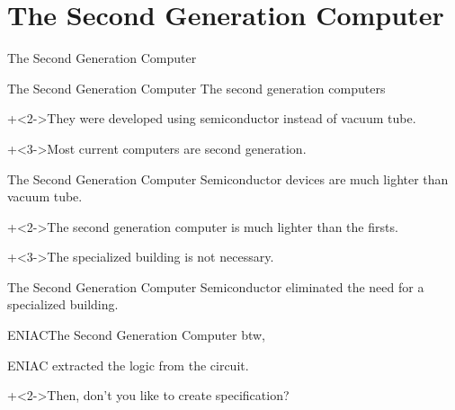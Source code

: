 %
%

\section{The Second Generation Computer}


\begin{frame}{}{}
    {\Large The Second Generation Computer}
\end{frame}


\begin{frame}{The Second Generation Computer}{}
    The second generation computers
    \vspace{2ex}

    \onslide+<2->{They were developed using semiconductor instead of vacuum tube.}
    \vspace{4ex}

    \onslide+<3->{Most current computers are second generation.}
\end{frame}


\begin{frame}{The Second Generation Computer}{}
    Semiconductor devices are much lighter than vacuum tube.
    \vspace{4ex}

    \onslide+<2->{The second generation computer is much lighter than the firsts.}
    \vspace{4ex}

    \onslide+<3->{The specialized building is not necessary.}
\end{frame}


\begin{frame}{The Second Generation Computer}{}
    Semiconductor eliminated the need for a specialized building.
\end{frame}


\begin{frame}{ENIAC}{The Second Generation Computer}
    btw,
    \vspace{2ex}

    ENIAC extracted the logic from the circuit.
    \vspace{4ex}

    \onslide+<2->{Then, don't you like to create specification?}
\end{frame}


